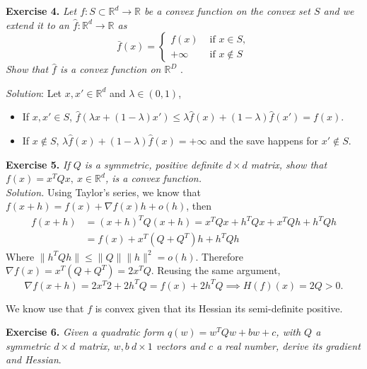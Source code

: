 \documentclass[11pt]{article}
\begin{document}
\textbf{Exercise 4. }\emph{Let \( f : S \subset \mathbb{R}^d  \to \mathbb{R}\) be a convex function on the convex set \( S \) and we extend it to an \( \hat{f}:\mathbb{R}^d \to \mathbb{R}\) as  }
\[
    \bar{f}(x) = \begin{cases}
        f(x) &\text{ if } x \in S,\\
        +\infty &\text{ if } x \notin S
    \end{cases}
\]
\emph{Show that \( \hat{f} \) is a convex function on \( \mathbb{R}^D \) }.

\emph{Solution}: Let \( x, x' \in \mathbb{R}^d \) and \( \lambda \in (0,1) \),
\begin{itemize}
    \item If \( x,x' \in S \), \( \hat{f}(\lambda x + (1-\lambda)x') \leq \lambda\hat{f}(x) + (1-\lambda)\hat{f}(x') = f(x) \).
    \item If \( x \notin S \), \( \lambda \hat{f}(x) + (1-\lambda)\hat{f}(x) =+\infty \) and the save happens for \( x' \notin S \).    
\end{itemize}

\textbf{Exercise 5. }\emph{If \( Q \) is a symmetric, positive definite \( d \times d \) matrix, show that \( f(x) = x^TQx, \ x \in \mathbb{R}^d \), is a convex function.}\\

\emph{Solution. } Using Taylor's series, we know that \( f(x + h) = f(x) + \nabla f(x)h + o(h) \), then
\[
    \begin{aligned}
     f(x + h) &= (x+h)^TQ(x+h)= x^TQx + h^TQx +x^TQh + h^TQh\\
     &= f(x) + x^T(Q + Q^T)h + h^TQh
    \end{aligned}
\] 
Where \( \|h^TQh\| \leq \|Q\|\|h\|^2 = o(h) \). Therefore \( \nabla f(x) = x^T(Q + Q^T) = 2x^TQ \). Reusing the same argument, 
\[
     \nabla f (x+h) = 2x^T2 + 2h^TQ = f(x) + 2h^TQ \implies H(f)(x) = 2Q > 0.
\]

We know use that \( f \) is convex given that its Hessian its semi-definite positive.

\textbf{Exercise 6. }\emph{Given a quadratic form \( q(w) = w^TQw + bw + c \), with \( Q \) a symmetric \( d\times d \) matrix, \( w,b\  d\times 1 \) vectors and \( c \) a real number, derive its gradient and Hessian}.
\end{document}
